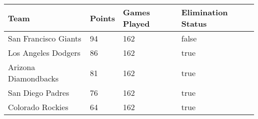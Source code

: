 \documentclass{report}
\begin{document}
\begin{tabular}{| l | l | l | l |}
\hline
Team & Points & Games Played & Elimination Status \\ \hline
San Francisco Giants & 94 & 162 & false\\
Los Angeles Dodgers & 86 & 162 & true\\
Arizona Diamondbacks & 81 & 162 & true\\
San Diego Padres & 76 & 162 & true\\
Colorado Rockies & 64 & 162 & true\\\hline
\end{tabular}\\ \\
\end{document}
